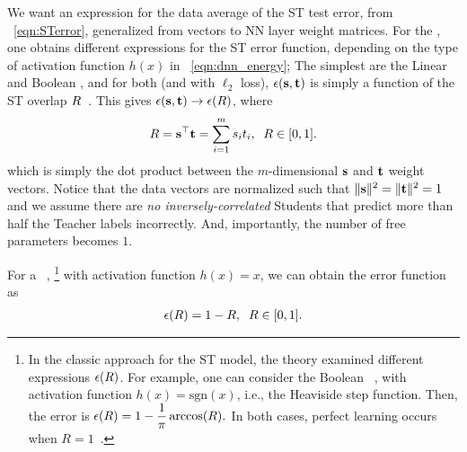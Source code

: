 We want an expression for the data average of the ST test error, from \EQN~\ref{eqn:STerror}, generalized from \Perceptron vectors to NN layer weight matrices.
For the \Perceptron, one obtains different expressions for the ST error function, depending on 
the type of activation function $h(x)$ in \EQN~\ref{eqn:dnn_energy};
The simplest are the Linear and Boolean \Perceptrons, and
for both (and with $\ell_2$ loss),
 $\epsilon({\mathbf{s}},{\mathbf{t}})$ is simply a function of the ST overlap $R$~\cite{SST92}.
This gives $\epsilon({\mathbf{s}}, {\mathbf{t}} )\rightarrow\epsilon(R)$, where
\begin{align}
  \label{eqn:Rdef}
R={\mathbf{s}}^{\top}{\mathbf{t}}=\sum_{i=1}^{m}s_{i}t_{i}, \;\;R\in[0,1].
\end{align}
which is simply the dot product between the $m$-dimensional \Student ${\mathbf{s}}$ and \Teacher ${\mathbf{t}}$ weight vectors.
 Notice that the data vectors are normalized such that $\Vert{\mathbf{s}}\Vert^{2}=\Vert
{\mathbf{t}}\Vert^{2}=1$ and 
we assume there are \emph{no inversely-correlated} Students that predict more than half the Teacher labels incorrectly. And, importantly, the number of free parameters becomes $1$.

For a \LinearPerceptron~\cite{SST92},%
\footnote{In the classic approach for the ST model, the theory examined different expressions $\epsilon(R)$.
For example, one can consider the  Boolean \Perceptron~\cite{SST92,Ros62}, with activation function $h(x)=\mbox{sgn}(x)$, 
i.e., the Heaviside step function. Then, the error is
$
\epsilon(R)=1 - \dfrac{1}{\pi}\arccos(R).
$
In both cases, perfect learning occurs when $R=1$~\cite{SST92}.
}
with activation function $h(x)=x$,  we can obtain the error function as
\begin{align}
\epsilon(R)=1-R,\;\;R\in[0,1].
\label{eqn:LinearPerceptronError}
\end{align}





